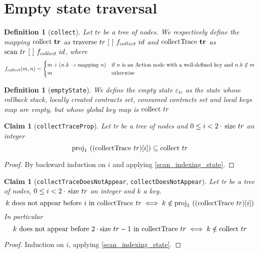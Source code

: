 \documentclass{article}
\newtheorem{definition}[lemma]{Definition}
\newtheorem{claim}[lemma]{Claim}
\newcommand{\textfun}[1]{\textup{#1}}
\newcommand{\textcode}[1]{\texttt{#1}}
\newcommand{\bolddef}[1]{\textbf{\ensuremath{\mathbf{#1}}}}
\newcommand{\fcoll}[2]{\ensuremath{f_{collect}(#1, #2)}}
\newcommand{\emptyList}{\ensuremath{[\ ]}}
\newcommand{\longtraverse}[4]{\textfun{traverse}\ #1\ #2\ #3 \ #4}
\newcommand{\longscan}[4]{\textfun{scan}\ #1\ #2\ #3 \ #4}
\newcommand{\collect}[1]{\textfun{collect}\ #1}
\newcommand{\collectTr}[1]{\textfun{collectTrace}\ #1}
\newcommand{\mapping}[1]{\textfun{mapping}\ #1}
\newcommand{\size}[1]{\textfun{size}\ #1}
\newcommand{\fst}[1]{\textfun{proj}_1\ #1}
\newcommand{\emptyState}[1]{\varepsilon_{#1}}
\begin{document}
\newpage

\section*{Empty state traversal}

\begin{definition}[\textcode{collect}]
    Let $tr$ be a tree of nodes. 
    We respectively define the mapping \bolddef{\collect{tr}} as $\longtraverse{tr}{\emptyList}{f_{collect}}{id}$ and \bolddef{\collectTr{tr}} as
    $\longscan{tr}{\emptyList}{f_{collect}}{id}$, where
    \[\fcoll{m}{n} = 
        \begin{cases} 
            m + (n.k \to \mapping{n}) &\text{if $n$ is an Action node with a well-defined key and $n.k \notin m$} \\
            m &\text{otherwise}
         \end{cases} \] 
\end{definition}

\begin{definition}[\textcode{emptyState}]
    We define the empty state $\emptyState{tr}$ as the state whose rollback stack, locally created contracts set, consumed contracts set and local keys map are empty, 
    but whose global key map is $\collect{tr}$
\end{definition}

\begin{claim}[\textcode{collectTraceProp}]
    \label{collect_submap}
    Let tr be a tree of nodes and $0 \leq i < 2 \cdot \, \size{tr}$ an integer
    \[\fst{((\collectTr{tr})[i])} \subseteq \collect{tr}\] 
\end{claim}

\begin{proof}
    By backward induction on $i$ and applying \cref{scan_indexing_state}.
\end{proof}

\begin{claim}[\textcode{collectTraceDoesNotAppear}, \textcode{collectDoesNotAppear}]
    \label{collect_not_contains}
    Let tr be a tree of nodes, $0 \leq i < 2 \cdot \, \size{tr}$ an integer and $k$ a key. 
    \[k \text{ does not appear before } i \text{ in } \collectTr{tr} \iff k \notin \fst{((\collectTr{tr})[i])}\] 
    In particular
    \[k \text{ does not appear before } 2 \cdot \size{tr} - 1 \text{ in } \collectTr{tr} \iff k \notin \collect{tr}\]
\end{claim}

\begin{proof}
    Induction on $i$, applying \cref{scan_indexing_state}.
\end{proof}
\end{document}
